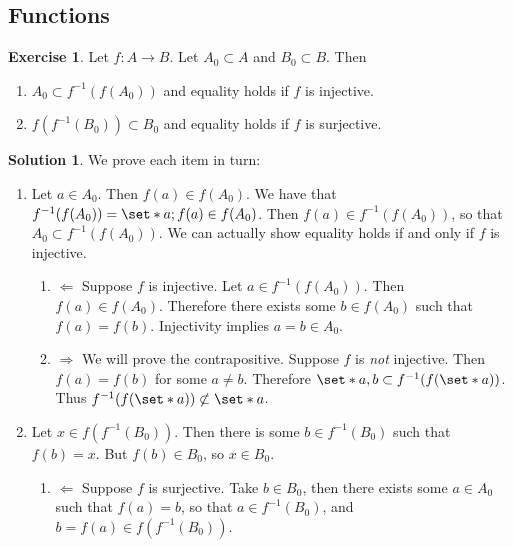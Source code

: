 \documentclass[11pt]{article}
\numberwithin{equation}{section}
\newcounter{theo}[section]\setcounter{theo}{0}
\theoremstyle{definition}
\theoremstyle{definition}
\newtheorem*{solution}{\color{Goldenrod}Solution}
\newtheorem{exercise}{\color{YellowOrange}Exercise}[section]
\newcommand\inv[1]{#1^{-1}}
\def\Set{\set*}%
\def\imp{\Rightarrow}
\def\pmi{\Leftarrow}
\newcommand{\1}{\mathbbm 1}
\begin{document}
\subsection{Functions}

\begin{exercise}
 Let $f : A \to B$. Let $A_0 \subset A$ and $B_0 \subset B$. Then
 \begin{enumerate}
  	\item $A_0 \subset \inv{f}(f(A_0))$ and equality holds if $f$ is injective.
  	\item $f(\inv{f}(B_0)) \subset B_0$ and equality holds if $f$ is surjective.
  \end{enumerate} 
\end{exercise}
\begin{solution} We prove each item in turn:
\begin{enumerate}
	\item Let $a \in A_0$. Then $f(a) \in f(A_0)$. We have that $\inv{f}(f(A_0)) = \Set{a;f(a) \in f(A_0)}$. Then $f(a) \in \inv{f}(f(A_0))$, so that $A_0 \subset \inv{f}(f(A_0))$. We can actually show equality holds if and only if $f$ is injective. 
	\begin{enumerate}
		\item $\pmi$ Suppose $f$ is injective. Let $a \in \inv{f}(f(A_0))$. Then $f(a) \in f(A_0)$. Therefore there exists some $b \in f(A_0)$ such that $f(a) = f(b)$. Injectivity implies $a=b \in A_0$. 
		\item $\imp$ We will prove the contrapositive. Suppose $f$ is \emph{not} injective. Then $f(a) = f(b)$ for some $a \neq b$. Therefore $\Set{a,b} \subset \inv{f}(f(\Set{a}))$. Thus $\inv{f}(f(\Set{a})) \not\subset \Set{a}$.
	\end{enumerate}
	\item Let $x \in f(\inv{f}(B_0))$. Then there is some $b \in \inv{f}(B_0)$ such that $f(b) = x$. But $f(b) \in B_0$, so $x \in B_0$.
	\begin{enumerate}
		\item $\pmi$ Suppose $f$ is surjective. Take $b \in B_0$, then there exists some $a \in A_0$ such that $f(a) = b$, so that $a \in \inv{f}(B_0)$, and $b=f(a) \in f(\inv{f}(B_0))$. 
	\end{enumerate}
\end{enumerate}
\end{solution}
\end{document}
